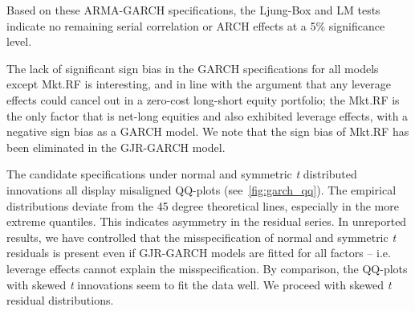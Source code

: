 

Based on these ARMA-GARCH specifications, the Ljung-Box and LM tests indicate no remaining serial correlation or ARCH effects at a 5\% significance level.

The lack of significant sign bias in the GARCH specifications for all models except Mkt.RF is interesting, and in line with the argument that any leverage effects could cancel out in a zero-cost long-short equity portfolio; the Mkt.RF is the only factor that is net-long equities and also exhibited leverage effects, with a negative sign bias as a GARCH model. We note that the sign bias of Mkt.RF has been eliminated in the GJR-GARCH model.

The candidate specifications under normal and symmetric \emph{t} distributed innovations all display misaligned QQ-plots (see~\autoref{fig:garch_qq}). The empirical distributions deviate from the 45 degree theoretical lines, especially in the more extreme quantiles. This indicates asymmetry in the residual series. In unreported results, we have controlled that the misspecification of normal and symmetric \emph{t} residuals is present even if GJR-GARCH models are fitted for all factors -- i.e. leverage effects cannot explain the misspecification. By comparison, the QQ-plots with skewed \emph{t} innovations seem to fit the data well. We proceed with skewed \textit{t} residual distributions.

